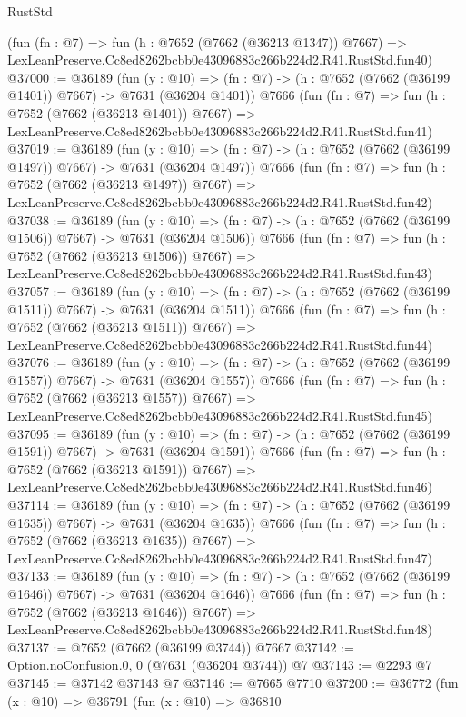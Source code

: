 \begin{lexlean}{RustStd}
\begin{coremodule}
    (fun (fn : @7) =>
    fun (h : @7652 (@7662 (@36213 @1347)) @7667) =>
    LexLeanPreserve.Cc8ed8262bcbb0e43096883c266b224d2.R41.RustStd.fun40)
@37000 := @36189
    (fun (y : @10) => (fn : @7) -> (h : @7652 (@7662 (@36199 @1401)) @7667) -> @7631 (@36204 @1401))
    @7666
    (fun (fn : @7) =>
    fun (h : @7652 (@7662 (@36213 @1401)) @7667) =>
    LexLeanPreserve.Cc8ed8262bcbb0e43096883c266b224d2.R41.RustStd.fun41)
@37019 := @36189
    (fun (y : @10) => (fn : @7) -> (h : @7652 (@7662 (@36199 @1497)) @7667) -> @7631 (@36204 @1497))
    @7666
    (fun (fn : @7) =>
    fun (h : @7652 (@7662 (@36213 @1497)) @7667) =>
    LexLeanPreserve.Cc8ed8262bcbb0e43096883c266b224d2.R41.RustStd.fun42)
@37038 := @36189
    (fun (y : @10) => (fn : @7) -> (h : @7652 (@7662 (@36199 @1506)) @7667) -> @7631 (@36204 @1506))
    @7666
    (fun (fn : @7) =>
    fun (h : @7652 (@7662 (@36213 @1506)) @7667) =>
    LexLeanPreserve.Cc8ed8262bcbb0e43096883c266b224d2.R41.RustStd.fun43)
@37057 := @36189
    (fun (y : @10) => (fn : @7) -> (h : @7652 (@7662 (@36199 @1511)) @7667) -> @7631 (@36204 @1511))
    @7666
    (fun (fn : @7) =>
    fun (h : @7652 (@7662 (@36213 @1511)) @7667) =>
    LexLeanPreserve.Cc8ed8262bcbb0e43096883c266b224d2.R41.RustStd.fun44)
@37076 := @36189
    (fun (y : @10) => (fn : @7) -> (h : @7652 (@7662 (@36199 @1557)) @7667) -> @7631 (@36204 @1557))
    @7666
    (fun (fn : @7) =>
    fun (h : @7652 (@7662 (@36213 @1557)) @7667) =>
    LexLeanPreserve.Cc8ed8262bcbb0e43096883c266b224d2.R41.RustStd.fun45)
@37095 := @36189
    (fun (y : @10) => (fn : @7) -> (h : @7652 (@7662 (@36199 @1591)) @7667) -> @7631 (@36204 @1591))
    @7666
    (fun (fn : @7) =>
    fun (h : @7652 (@7662 (@36213 @1591)) @7667) =>
    LexLeanPreserve.Cc8ed8262bcbb0e43096883c266b224d2.R41.RustStd.fun46)
@37114 := @36189
    (fun (y : @10) => (fn : @7) -> (h : @7652 (@7662 (@36199 @1635)) @7667) -> @7631 (@36204 @1635))
    @7666
    (fun (fn : @7) =>
    fun (h : @7652 (@7662 (@36213 @1635)) @7667) =>
    LexLeanPreserve.Cc8ed8262bcbb0e43096883c266b224d2.R41.RustStd.fun47)
@37133 := @36189
    (fun (y : @10) => (fn : @7) -> (h : @7652 (@7662 (@36199 @1646)) @7667) -> @7631 (@36204 @1646))
    @7666
    (fun (fn : @7) =>
    fun (h : @7652 (@7662 (@36213 @1646)) @7667) =>
    LexLeanPreserve.Cc8ed8262bcbb0e43096883c266b224d2.R41.RustStd.fun48)
@37137 := @7652 (@7662 (@36199 @3744)) @7667
@37142 := Option.noConfusion.{0, 0} (@7631 (@36204 @3744)) @7
@37143 := @2293 @7
@37145 := @37142 @37143 @7
@37146 := @7665 @7710
@37200 := @36772
    (fun (x : @10) =>
    @36791
      (fun (x : @10) =>
      @36810

\end{coremodule}
\end{lexlean}
